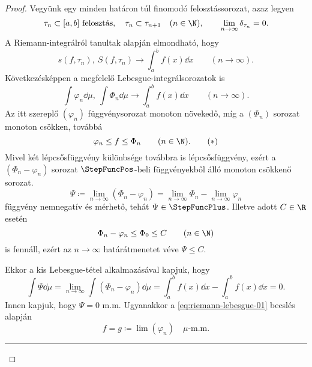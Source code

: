 \documentclass[
]{elteikthesis}[2024/04/26]
\begin{document}
\begin{proof}
		Vegyünk egy minden határon túl finomodó felosztássorozat, azaz legyen
		\[
			\tau_n \subset [a, b] \text{ felosztás}, \quad
			\tau_n \subset \tau_{n + 1} \quad (n \in \N), \qquad
			\lim_{n \to \infty} \delta_{\tau_n} = 0.
		\]
		A Riemann-integrálról tanultak alapján elmondható, hogy
		\[
			s(f, \tau_n), \ S(f, \tau_n) \longrightarrow  \int_a^b f(x) \dd{x}
			\qquad (n \to \infty).
		\]
		Következésképpen a megfelelő Lebesgue-integrálsorozatok is
		\[
			\int \varphi_n \dd{\mu}, \
			\int \Phi_n    \dd{\mu} \longrightarrow  \int_a^b f(x) \dd{x}
			\qquad (n \to \infty).
		\]
		Az itt szereplő \( (\varphi_n) \) függvénysorozat monoton növekedő,
		míg a \( (\Phi_n) \) sorozat monoton csökken, továbbá
		\begin{equation}\label{eq:riemann-lebesgue-01}
			\varphi_n \leq f \leq \Phi_n
			\qquad (n \in \N).
			\tag{\( * \)}
		\end{equation}
		Mivel két lépcsősfüggvény különbsége továbbra is lépcsősfüggvény, 
		ezért a \( (\Phi_n - \varphi_n) \) sorozat \( \StepFuncPos \)-beli függvényekből álló monoton csökkenő sorozat.
		\[
			\Psi \coloneq 
			\lim_{n \to \infty} (\Phi_n - \varphi_n) =
			\lim_{n \to \infty} \Phi_n - \lim_{n \to \infty} \varphi_n
		\]
		függvény nemnegatív és mérhető, tehát \( \Psi \in \StepFuncPlus \). 
		Illetve adott \( C \in \R \) esetén
		\[
			\Phi_n - \varphi_n \leq \Phi_0 \leq C \qquad (n \in \N)
		\]
		is fennáll, 
		ezért az \( n \to \infty \) határátmenetet véve \( \Psi \leq C \).
		
		Ekkor a kis Lebesgue-tétel alkalmazásával kapjuk, hogy
		\[
			\int \Psi \dd{\mu} =
			\lim_{n \to \infty} \int (\Phi_n - \varphi_n) \dd{\mu} =
			\int_a^b f(x) \dd{x} - \int_a^b f(x) \dd{x} =
			0.
		\]
		Innen kapjuk, hogy \( \Psi = 0 \) m.m.
		Ugyanakkor a \eqref{eq:riemann-lebesgue-01} becslés alapján
		\begin{equation*}\label{eq:riemann-lebesgue-02}
			f = g \coloneq \lim(\varphi_n) \quad \mu \text{-m.m.}
			\tag{\( ** \)}
		\end{equation*}
		
		\vspace{6pt}
		\hrule
		\vspace{9pt}
				

\end{proof}
\end{document}
